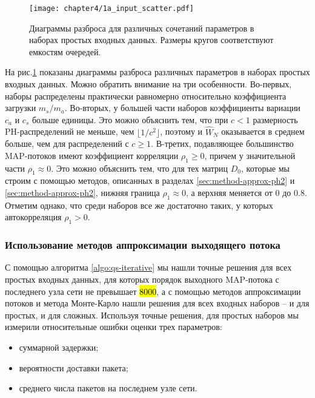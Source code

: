 \begin{figure}[h]
    \texttt{[image: chapter4/1a\_input\_scatter.pdf]}
    \caption{Диаграммы разброса для различных сочетаний параметров в наборах простых входных данных. Размеры кругов соответствуют емкостям очередей.}\label{fig:results-approx-input-scatter}
\end{figure}

На рис.\ref{fig:results-approx-input-scatter} показаны диаграммы разброса различных параметров в наборах простых входных данных. Можно обратить внимание на три особенности. Во-первых, наборы распределены практически равномерно относительно коэффициента загрузки $m_s / m_a$. Во-вторых, у большей части наборов коэффициенты вариации $c_a$ и $c_s$ больше единицы. Это можно объяснить тем, что при $c < 1$ размерность PH-распределений не меньше, чем $\lfloor 1/c^2 \rfloor$, поэтому и $\hat{W}_N$ оказывается в среднем больше, чем для распределений с $c \geqslant 1$. В-третих, подавляющее большинство MAP-потоков имеют коэффициент корреляции $\rho_1 \geqslant 0$, причем у значительной части $\rho_1 \approx 0$. Это можно объяснить тем, что для тех матриц $D_0$, которые мы строим с помощью методов, описанных в разделах \ref{sec:method-approx-ph2} и \ref{sec:method-approx-ph2}, нижняя граница $\rho_1 \approx 0$, а верхняя меняется от 0 до $0.8$. Отметим однако, что среди наборов все же достаточно таких, у которых автокорреляция $\rho_1 > 0$.



\subsubsection{Использование методов аппроксимации выходящего потока}

С помощью алгоритма \ref{algo:qs-iterative} мы нашли точные решения для всех простых входных данных, для которых порядок выходного MAP-потока с последнего узла сети не превышает \hl{8000}, а с помощью методов аппроксимации потоков и метода Монте-Карло нашли решения для всех входных наборов -- и для простых, и для сложных. Используя точные решения, для простых наборов мы измерили относительные ошибки оценки трех параметров:

\begin{itemize}
    \item суммарной задержки;
    \item вероятности доставки пакета;
    \item среднего числа пакетов на последнем узле сети.
\end{itemize}

